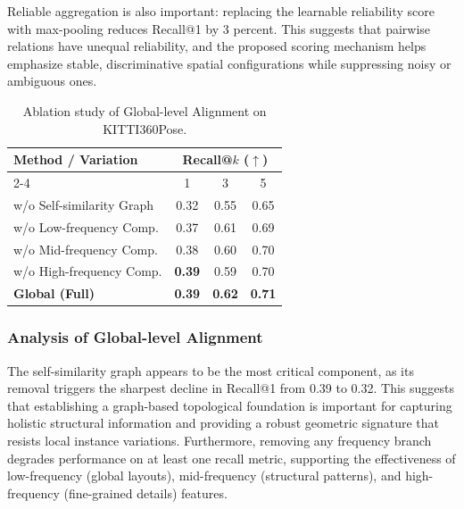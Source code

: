 \documentclass{article}
\begin{document}
Reliable aggregation is also important: replacing the learnable reliability score with max-pooling reduces Recall@1 by 3 percent. This suggests that pairwise relations have unequal reliability, and the proposed scoring mechanism helps emphasize stable, discriminative spatial configurations while suppressing noisy or ambiguous ones.
\setlength{\intextsep}{4pt}
\setlength{\columnsep}{8pt}
\begin{table}
    \centering
    \small
    \caption{Ablation study of Global-level Alignment on KITTI360Pose.}
    \label{tab:ablation_global_wrap}
    \renewcommand{\arraystretch}{1.1}
    \setlength{\tabcolsep}{3.5pt}
    \begin{tabular}{l|ccc}
        \toprule
        \multirow{2}{*}{Method / Variation} & \multicolumn{3}{c}{Recall@$k$ ($\uparrow$)} \\
        \cmidrule{2-4}
        & 1 & 3 & 5 \\ 
        \midrule
        w/o Self-similarity Graph        & 0.32 & 0.55 & 0.65 \\
        w/o Low-frequency Comp.          & 0.37 & 0.61 & 0.69 \\
        w/o Mid-frequency Comp.          & 0.38 & 0.60 & 0.70 \\
        w/o High-frequency Comp.         & \textbf{0.39} & 0.59 & 0.70 \\
        \midrule
        \rowcolor[gray]{0.9} \textbf{Global (Full)} & \textbf{0.39} & \textbf{0.62} & \textbf{0.71} \\
        \bottomrule
    \end{tabular}
    \vspace{-10pt}
\end{table}
\subsubsection{Analysis of Global-level Alignment}
The self-similarity graph appears to be the most critical component, as its removal triggers the sharpest decline in Recall@1 from 0.39 to 0.32. This suggests that establishing a graph-based topological foundation is important for capturing holistic structural information and providing a robust geometric signature that resists local instance variations. Furthermore, removing any frequency branch degrades performance on at least one recall metric, supporting the effectiveness of low-frequency (global layouts), mid-frequency (structural patterns), and high-frequency (fine-grained details) features. 
\end{document}
